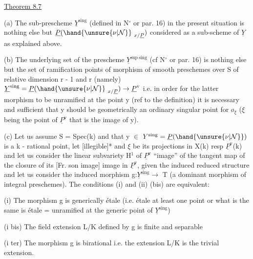 
\uline{Theorem 8.7}

(a) The sub-prescheme $\underline{Y}^{\mathrm{sing}}$ (defined in N$^\circ$ or par. 16) in the
present situation is nothing else but $\underline{P}(\hand{\unsure{\nu|\mathcal{N}}}_{\ x/\underline{P}})$ considered as a
sub-scheme of $\underline{Y}$ as explained above.

(b) The underlying set of the prescheme $\underline{Y}^{\mathrm{sup\ sing}}$ (cf N$^\circ$ or
par. 16) is nothing else but the set of ramification points of
morphism of smooth preschemes over S of relative dimension r - 1
and r (namely) $\underline{Y}^{\mathrm{sing}} = \underline{P}(\hand{\unsure{\nu|\mathcal{N}}}_{\ x/\underline{P}}) \rightarrow \underline{P}^{\mathrm{v}}$ i.e. in order for the latter
morphism to be unramified at the point y (ref to the definition)
it is necessary and sufficient that y should be geometrically an
ordinary singular point for $\text{ø}_{\xi}$ ($\xi$ being the point of $\underline{P}^{\mathrm{v}}$ that is the
image of y).

(c) Let us assume S = Spec(k) and that y $\in$ $Y^{\mathrm{sing}} = \underline{P}(\hand{\unsure{\nu|\mathcal{N}}})$ is
a k - rational point, let [illegible]* and $\xi$ be its projections in
X(k) resp $\underline{P}^{\mathrm{v}}$(k) and let us consider the linear subvariety H$^1$ of $\underline{P}^{\mathrm{v}}$
``image'' of the tangent map of the closure of its [Fr. son image]
image in $\underline{P}^{\mathrm{v}}$, given the induced reduced structure and let us
consider the induced morphism g:$\underline{Y}^{\mathrm{sing}} \rightarrow$ T (a dominant morphism of
integral preschemes). The conditions (i) and (ii) (bis) are
equivalent:

(i) The morphism g is generically étale (i.e. étale at least
one point or what is the same is étale = unramified at the generic
point of $\underline{Y}^{\mathrm{sing}}$)

(i bis) The field extension L/K defined by g is finite and
separable

(i ter) The morphism g is birational i.e. the extension L/K
is the trivial extension.

